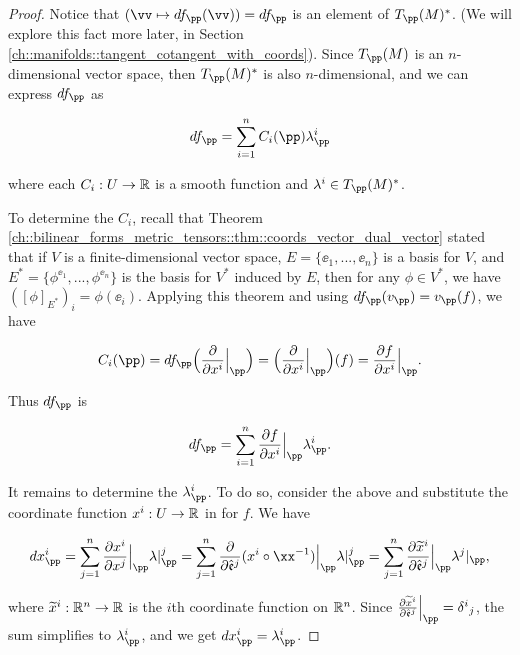 \begin{proof}
    Notice that $(\vv \mapsto df_\pp(\vv)) = df_\pp$ is an element of $T_\pp(M)^*$. (We will explore this fact more later, in Section \ref{ch::manifolds::tangent_cotangent_with_coords}). Since $T_\pp(M)$ is an $n$-dimensional vector space, then $T_\pp(M)^*$ is also $n$-dimensional, and we can express $df_\pp$ as
    
    \begin{align*}
        df_\pp = \sum_{i = 1}^n C_i(\pp) \lambda^i_\pp
    \end{align*}
    
    where each $C_i:U \rightarrow \mathbb{R}$ is a smooth function and $\lambda^i \in T_\pp(M)^*$.
    
    To determine the $C_i$, recall that Theorem \ref{ch::bilinear_forms_metric_tensors::thm::coords_vector_dual_vector} stated that if $V$ is a finite-dimensional vector space, $E = \{\ee_1, ..., \ee_n\}$ is a basis for $V$, and $E^* = \{\phi^{\ee_1}, ..., \phi^{\ee_n}\}$ is the basis for $V^*$ induced by $E$, then for any $\phi \in V^*$, we have $([\phi]_{E^*})_i = \phi(\ee_i)$. Applying this theorem and using $df_\pp(v_\pp) = v_\pp(f)$, we have
    
    \begin{align*}
        C_i(\pp) = df_\pp\Big( \frac{\pd}{\pd x^i}\Big|_\pp \Big) = \Big( \frac{\pd}{\pd x^i}\Big|_\pp \Big) (f) = \frac{\pd f}{\pd x^i}\Big|_\pp.
    \end{align*}
    
    Thus $df_\pp$ is
    
    \begin{align*}
        df_\pp = \sum_{i = 1}^n \frac{\pd f}{\pd x^i}\Big|_\pp \lambda^i_\pp.
    \end{align*}
    
    It remains to determine the $\lambda^i_\pp$. To do so, consider the above and substitute the coordinate function $x^i:U \rightarrow \mathbb{R}$ in for $f$. We have
    
    \begin{align*}
        dx^i_\pp = \sum_{j = 1}^n \frac{\pd x^i}{\pd x^j}\Big|_\pp \lambda|_\pp^j = \sum_{j = 1}^n \frac{\pd}{\pd \see^j}(x^i \circ \xx^{-1}) \Big|_\pp \lambda|_\pp^j = \sum_{j = 1}^n \frac{\pd \widetilde{x}^i}{\pd \see^j}\Big|_\pp \lambda^j|_\pp,
    \end{align*}

    where $\widetilde{x}^i:\mathbb{R}^n \rightarrow \mathbb{R}$ is the $i$th coordinate function on $\mathbb{R}^n$. Since $\frac{\pd \widetilde{x}^i}{\pd \see^j}\Big|_\pp = \delta^i{}_j$, the sum simplifies to $\lambda^i_\pp$, and we get $dx^i_\pp = \lambda^i_\pp$.
\end{proof}

